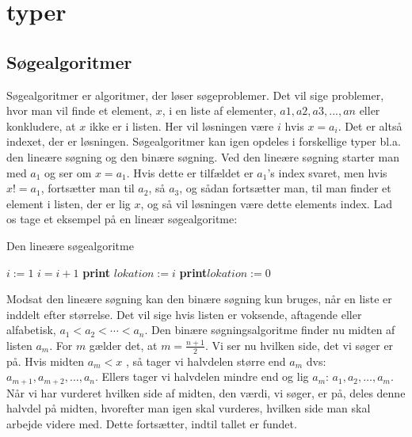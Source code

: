 \section{typer}
\subsection{Søgealgoritmer}
Søgealgoritmer er algoritmer, der løser søgeproblemer. Det vil sige problemer, hvor man vil finde et element, $x$, i en liste af elementer, $a1, a2, a3, ..., an$ eller konkludere, at $x$ ikke er i listen. Her vil løsningen være $i$ hvis $x=a_{i}$. Det er altså indexet, der er løsningen. Søgealgoritmer kan igen opdeles i forskellige typer bl.a. den lineære søgning og den binære søgning. Ved den lineære søgning starter man med $a_1$ og ser om $x=a_{1}$. Hvis dette er tilfældet er $a_{1}$'s index svaret, men hvis $x!=a_{1}$, fortsætter man til $a_{2}$, så $a_{3}$, og sådan fortsætter man, til man finder et element i listen, der er lig $x$, og så vil løsningen være dette elements index. Lad os tage et eksempel på en lineær søgealgoritme:

\begin{algorithm}
\caption{Den lineære søgealgoritme}
\begin{algorithmic}[1]

    \State $i:=1$
        \State $i=i+1$
    \State \textbf{print} $lokation:=i$
    \Else
    \State \textbf{print}$lokation:=0$
    \EndIf
    \EndWhile  \label{roy's loop}
\EndProcedure

\end{algorithmic}
\end{algorithm}


Modsat den lineære søgning kan den binære søgning kun bruges, når en liste er inddelt efter størrelse. Det vil sige hvis listen er voksende, aftagende eller alfabetisk, $a_{1}<a_{2}<\dotsb<a_{n}$. Den binære søgningsalgoritme finder nu midten af listen $a_{m}$. For $m$ gælder det, at $m=\frac{n+1}{2}$. Vi ser nu hvilken side, det vi søger er på. Hvis midten $a_{m}<x$ , så tager vi halvdelen større end $a_{m}$ dvs: $a_{m+1}, a_{m+2},\dotsc,a_{n}$. Ellers tager vi halvdelen mindre end og lig $a_{m}$: $a_{1}, a_{2},\dotsc,a_{m}$. Når vi har vurderet hvilken side af midten, den værdi, vi søger, er på, deles denne halvdel på midten, hvorefter man igen skal vurderes, hvilken side man skal arbejde videre med. Dette fortsætter, indtil tallet er fundet. 

